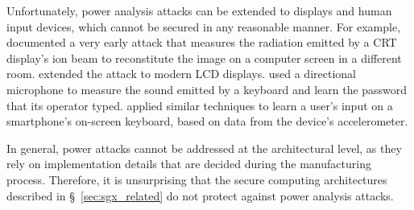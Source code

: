 Unfortunately, power analysis attacks can be extended to displays and human
input devices, which cannot be secured in any reasonable manner. For example,
\cite{van1985monitorpa} documented a very early attack that measures the
radiation emitted by a CRT display's ion beam to reconstitute the image on a
computer screen in a different room. \cite{kuhn2005lcdpa} extended the attack
to modern LCD displays. \cite{zhuang2009keyboard} used a directional microphone
to measure the sound emitted by a keyboard and learn the password that its
operator typed. \cite{owusu2012accessory} applied similar techniques to learn a
user's input on a smartphone's on-screen keyboard, based on data from the
device's accelerometer.

In general, power attacks cannot be addressed at the architectural level, as
they rely on implementation details that are decided during the manufacturing
process. Therefore, it is unsurprising that the secure computing architectures
described in \S~\ref{sec:sgx_related} do not protect against power analysis
attacks.
